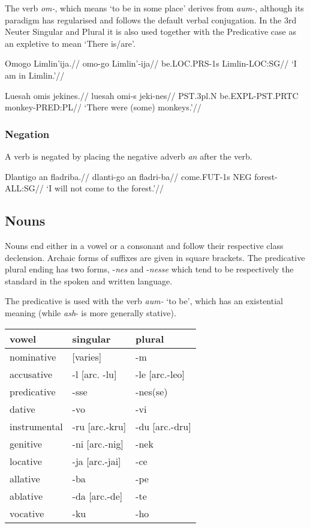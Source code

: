 \documentclass[
  a4paper,
]{article}
\begin{document}
The verb \emph{om-}, which means `to be in some place' derives from
\emph{aum-}, although its paradigm has regularised and follows the
default verbal conjugation. In the 3rd Neuter Singular and Plural it is
also used together with the Predicative case as an expletive to mean
`There is/are'.

\ex \begingl \glpreamble Omogo Limlin'ija.// \gla omo-go Limlin'-ija//
\glb be.LOC.PRS-1s Limlin-LOC:SG// \glft `I am in Limlin.'// \endgl \xe

\ex \begingl \glpreamble Luesah omis jekines.// \gla luesah omi-s
jeki-nes// \glb PST.3pl.N be.EXPL-PST.PRTC monkey-PRED:PL// \glft `There
were (some) monkeys.'// \endgl \xe

\hypertarget{negation}{%
\subsubsection{Negation}\label{negation}}

A verb is negated by placing the negative adverb \emph{an} after the
verb.

\ex \begingl \glpreamble Dlantigo an fladriba.// \gla dlanti-go an
fladri-ba// \glb come.FUT-1s NEG forest-ALL:SG// \glft `I will not come
to the forest.'// \endgl \xe

\hypertarget{nouns}{%
\subsection{Nouns}\label{nouns}}

Nouns end either in a vowel or a consonant and follow their respective
class declension. Archaic forms of suffixes are given in square
brackets. The predicative plural ending has two forms, -\emph{nes} and
-\emph{nesse} which tend to be respectively the standard in the spoken
and written language.

The predicative is used with the verb \emph{aum-} `to be', which has an
existential meaning (while \emph{ash}- is more generally stative).

\begin{longtable}[]{@{}lll@{}}
\toprule
vowel & singular & plural \\
\midrule
\endhead
nominative & {[}varies{]} & -m \\
accusative & -l {[}arc. -lu{]} & -le {[}arc.-leo{]} \\
predicative & -sse & -nes(se) \\
dative & -vo & -vi \\
instrumental & -ru {[}arc.-kru{]} & -du {[}arc.-dru{]} \\
genitive & -ni {[}arc.-nig{]} & -nek \\
locative & -ja {[}arc.-jai{]} & -ce \\
allative & -ba & -pe \\
ablative & -da {[}arc.-de{]} & -te \\
vocative & -ku & -ho \\
\bottomrule
\end{longtable}
\end{document}
